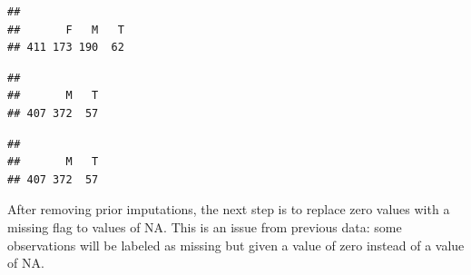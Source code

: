 \documentclass[nojss]{jss}
\begin{document}
\begin{knitrout}
\begin{kframe}
\begin{alltt}
                  \hlstd{=} \hlstd{)}
\hlopt{$}
\end{alltt}
\begin{verbatim}
## 
##       F   M   T 
## 411 173 190  62
\end{verbatim}
\begin{alltt}
\hlopt{$}
\end{alltt}
\begin{verbatim}
## 
##       M   T 
## 407 372  57
\end{verbatim}
\begin{alltt}
\hlstd{(} 
                  \hlstd{=} \hlstd{,}
                  \hlstd{=}
                     \hlstd{,}
                  \hlstd{=} \hlstd{,}
                  \hlstd{=} \hlstd{,}
                  \hlstd{=} \hlstd{,}
                  \hlstd{=} \hlstd{)}
\hlopt{$}
\end{alltt}
\begin{verbatim}
## 
##       M   T 
## 407 372  57
\end{verbatim}
\end{kframe}
\end{knitrout}

After removing prior imputations, the next step is to replace zero
values with a missing flag to values of NA. This is an issue from previous
data: some observations will be labeled as missing but given a value of zero
instead of a value of NA.
\end{document}

